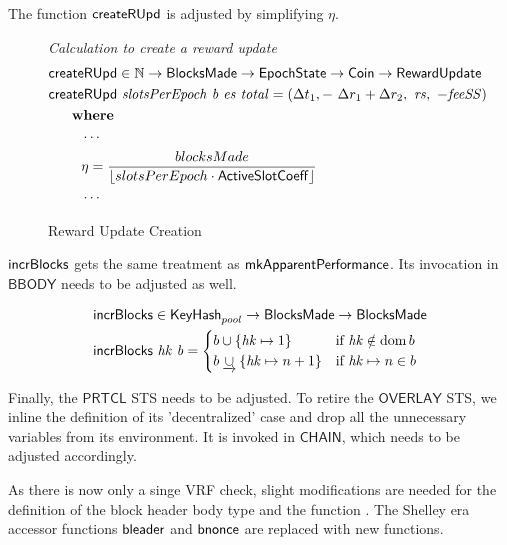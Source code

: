 The function $\mathsf{createRUpd}$ is adjusted by simplifying $\eta$.

\begin{figure}[htb]
  \emph{Calculation to create a reward update}
  \begin{align*}
    & \mathsf{createRUpd} \in \mathbb{N} \to \mathsf{BlocksMade} \to \mathsf{EpochState} \to \mathsf{Coin} \to \mathsf{RewardUpdate} \\
    & \mathsf{createRUpd}~\mathit{slotsPerEpoch}~\mathit{b}~\mathit{es}~\mathit{total} = \left(
      \Delta t_1,-~\Delta r_1+\Delta r_2,~\mathit{rs},~-\mathit{feeSS}\right) \\
    & ~~~~ ~ \mathbf{where}~ ~  \\
    & ~~~~~~~\dotsb \\
    & ~~~~~~~\eta =
        \frac{blocksMade}{\lfloor{slotsPerEpoch} \cdot \mathsf{ActiveSlotCoeff}\rfloor} \\
    & ~~~~~~~\dotsb
  \end{align*}

  \caption{Reward Update Creation}
  \label{fig:functions:reward-update-creation}
\end{figure}

$\mathsf{incrBlocks}$ gets the same treatment as $\mathsf{mkApparentPerformance}$. Its invocation in $\mathsf{BBODY}$ needs to be adjusted as well.

\begin{figure}
  \begin{align*}
      & \mathsf{incrBlocks} \in \mathsf{KeyHash}_{pool} \to
          \mathsf{BlocksMade} \to \mathsf{BlocksMade} \\
      & \mathsf{incrBlocks}~\mathit{hk}~\mathit{b} =
        \begin{cases}
          b\cup\{\mathit{hk}\mapsto 1\} & \text{if }\mathit{hk}\notin\operatorname{dom}{b} \\
          b\mathbin{\underrightarrow\cup}\{\mathit{hk}\mapsto n+1\} & \text{if }\mathit{hk}\mapsto n\in b \\
        \end{cases}
  \end{align*}
\end{figure}

\newpage
Finally, the $\mathsf{PRTCL}$ STS needs to be adjusted. To retire the $\mathsf{OVERLAY}$ STS, we inline the definition of its 'decentralized' case and drop all the unnecessary variables from its environment. It is invoked in $\mathsf{CHAIN}$, which needs to be adjusted accordingly.

As there is now only a singe VRF check, slight modifications are needed for the definition of the block header body  type and the function . The Shelley era accessor functions $\mathsf{bleader}$ and $\mathsf{bnonce}$ are replaced with new functions.

